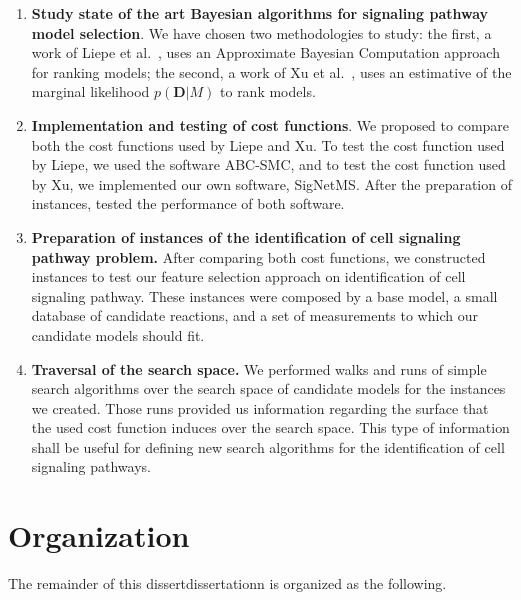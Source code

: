 \begin{enumerate}
    \item{{\bf Study state of the art Bayesian algorithms for signaling
        pathway model selection}. We have chosen two methodologies to
        study: the first, a work of Liepe et al.~\cite{Liepe2014}, uses
        an Approximate Bayesian Computation approach for ranking models;
        the second, a work of Xu et al.~\cite{Xura20}, uses an
        estimative of the marginal likelihood $p({\bm D}| M)$ to rank
        models.}
    \item{{\bf Implementation and testing of cost functions}. We proposed
        to compare both the cost functions used by Liepe and Xu. To test
        the cost function used by Liepe, we used the software
        ABC-SMC, and to test the cost function used by Xu, we
        implemented our own software, SigNetMS. After the preparation of
        instances, tested the performance of both software.}
    \item{{\bf Preparation of instances of the identification of cell
        signaling pathway problem.} After comparing both cost functions,
        we constructed instances to test our feature selection
        approach on identification of cell signaling pathway. These
        instances were composed by a base model, a small database of
        candidate reactions, and a set of measurements to which our
        candidate models should fit.}
    \item{{\bf Traversal of the search space.} We performed
        walks and runs of simple search algorithms over the search space
        of candidate models for the instances we created. Those runs
        provided us information regarding the surface that the used cost 
        function induces over the search space. This type of information
        shall be useful for defining new search algorithms for the
        identification of cell signaling pathways.}
\end{enumerate}

\section{Organization}

The remainder of this dissertdissertationn is organized as the following.

